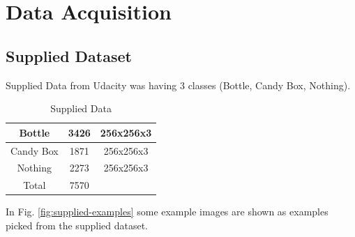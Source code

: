 \documentclass[10pt,journal,compsoc]{IEEEtran}
\begin{document}
\section{Data Acquisition}

\subsection{Supplied Dataset}

Supplied Data from Udacity was having 3 classes (Bottle, Candy Box, Nothing).

\begin{table}[h]
\caption{Supplied Data}
\label{table_example}
\begin{center}
\begin{tabular}{|c|c|c|}
\hline
Bottle & 3426 &	256x256x3\\
\hline
Candy Box &	1871 & 256x256x3\\
\hline
Nothing & 2273 & 256x256x3\\
\hline
Total & 7570 & \\
\hline
\end{tabular}
\end{center}
\end{table}

In Fig. \ref{fig:supplied-examples} some example images are shown as examples picked from the supplied dataset.
\end{document}
